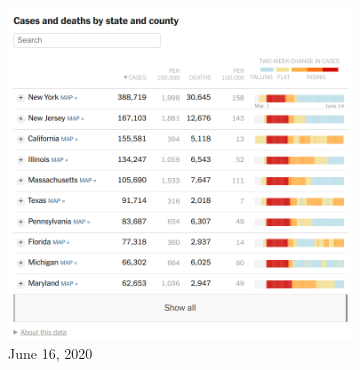 \documentclass[article]{jdssv}\usepackage[]{graphicx}\usepackage[]{xcolor}
\begin{document}
% 
% 

\begin{figure}
\centering
\begin{subfigure}[t]{.25\textwidth}
\includegraphics[width=\textwidth]{nyt-wayback-20200616}
\caption{June 16, 2020}\label{fig:nyt-colors1}
\end{subfigure}\hfill
\begin{subfigure}[t]{.25\textwidth}

\end{subfigure}
\end{figure}
\end{document}
